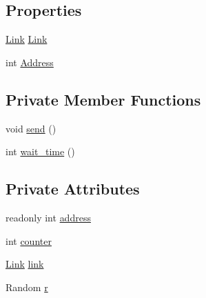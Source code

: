 \subsection*{Properties}
\begin{DoxyCompactItemize}
\item 
\hyperlink{classNetTrafficSimulator_1_1Link}{Link} \hyperlink{classNetTrafficSimulator_1_1EndNode_aaa7c476166fa515ebc9d16c6ccc83875}{Link}
\item 
int \hyperlink{classNetTrafficSimulator_1_1EndNode_ad810757c44c8e17c2147a2ae1598a840}{Address}
\end{DoxyCompactItemize}
\subsection*{Private Member Functions}
\begin{DoxyCompactItemize}
\item 
void \hyperlink{classNetTrafficSimulator_1_1EndNode_a021bef61770e7ec3561b24edca6526ba}{send} ()
\item 
int \hyperlink{classNetTrafficSimulator_1_1EndNode_a9287a628dea98e2611bde679eb3c63da}{wait\-\_\-time} ()
\end{DoxyCompactItemize}
\subsection*{Private Attributes}
\begin{DoxyCompactItemize}
\item 
readonly int \hyperlink{classNetTrafficSimulator_1_1EndNode_a84d0df6c9c755c895dffff6a531823d2}{address}
\item 
int \hyperlink{classNetTrafficSimulator_1_1EndNode_a9b636da52746d85bf43875f0ea596dd5}{counter}
\item 
\hyperlink{classNetTrafficSimulator_1_1Link}{Link} \hyperlink{classNetTrafficSimulator_1_1EndNode_a3fde207ff4a49bafd01df2e89fff7d11}{link}
\item 
Random \hyperlink{classNetTrafficSimulator_1_1EndNode_ab68702887e7cdb3933a3a006ea508a76}{r}
\end{DoxyCompactItemize}


